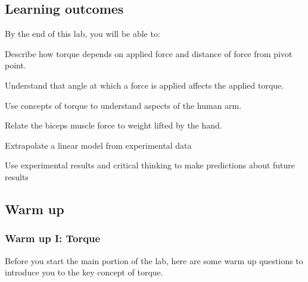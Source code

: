 \documentclass[11pt,letterpaper]{article}
\newcommand{\TODO}[2][inline,color=green!40,caption={}]{{ \todo[#1]{#2} }}
\renewcommand{\TODO}[2][]{}
\begin{document}
\subsection*{Learning outcomes}
By the end of this lab, you will be able to:
\enumb[label=\roman*.]
\item Describe how torque depends on applied force and distance 
of force from pivot point.
\item Understand that angle at which a force is applied 
	affects the applied torque.
\item Use concepts of torque to understand aspects of the human arm.
\item Relate the biceps muscle force to weight lifted by the hand.
\item Extrapolate a linear model from experimental data
\item Use experimental results and critical thinking
	to make predictions about future results
\enume

\pagebreak

\subsection*{Warm up}

\subsubsection*{Warm up I:  Torque}

\TODO[inline]{Note:  These questions would probably work better if
	the students could actually perform 
	some of these mini-experiments.
	I'm planning to talk to those in charge (not Marty, but others)
	to ask whether we have the materials needed to investigate 
	the balance of torques on a simple lever-fulcrum system
	(like the one in the 
	\href{https://www.dropbox.com/sh/i3iftgdflca6yj0/AAA37zsDuMN591__i-oPnjiSa/Suite\%20II/Instruction/Student_Materials/01_Torque/Tutorial_01_Torque.doc?dl=0}
	{open source tutorial activity}
	).
	{\bf Such an apparatus will not be available this quarter, but it may
	work for next quarter} -- 
	depending on the resources already in place.
}

Before you start the main portion of the lab, 
here are some warm up questions to introduce you to the key concept of torque.
\end{document}
